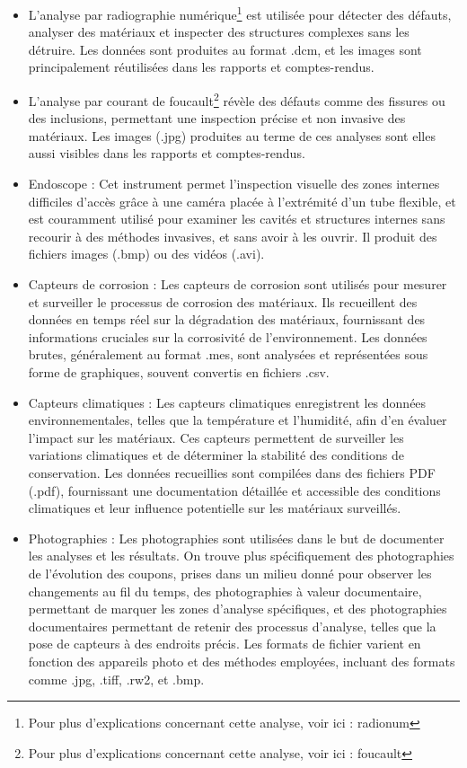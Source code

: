 \begin{itemize}
    \item L'analyse par radiographie numérique\footnote{Pour plus d'explications concernant cette analyse, voir ici : \gls{radionum}} est utilisée pour détecter des défauts, analyser des matériaux et inspecter des structures complexes sans les détruire. Les données sont produites au format .dcm, et les images sont principalement réutilisées dans les rapports et comptes-rendus.\\
    \item L'analyse par courant de foucault\footnote{Pour plus d'explications concernant cette analyse, voir ici : \gls{foucault}} révèle des défauts comme des fissures ou des inclusions, permettant une inspection précise et non invasive des matériaux. Les images (.jpg) produites au terme de ces analyses sont elles aussi visibles dans les rapports et comptes-rendus.\\
    \item Endoscope : Cet instrument permet l'inspection visuelle des zones internes difficiles d'accès grâce à une caméra placée à l'extrémité d'un tube flexible, et est couramment utilisé pour examiner les cavités et structures internes sans recourir à des méthodes invasives, et sans avoir à les ouvrir. Il produit des fichiers images (.bmp) ou des vidéos (.avi).\\
    \item Capteurs de corrosion : Les capteurs de corrosion sont utilisés pour mesurer et surveiller le processus de corrosion des matériaux. Ils recueillent des données en temps réel sur la dégradation des matériaux, fournissant des informations cruciales sur la corrosivité de l'environnement. Les données brutes, généralement au format .mes, sont analysées et représentées sous forme de graphiques, souvent convertis en fichiers .csv.\\
    \item Capteurs climatiques : Les capteurs climatiques enregistrent les données environnementales, telles que la température et l'humidité, afin d’en évaluer l’impact sur les matériaux. Ces capteurs permettent de surveiller les variations climatiques et de déterminer la stabilité des conditions de conservation. Les données recueillies sont compilées dans des fichiers PDF (.pdf), fournissant une documentation détaillée et accessible des conditions climatiques et leur influence potentielle sur les matériaux surveillés.\\
    \item Photographies : Les photographies sont utilisées dans le but de documenter les analyses et les résultats. On trouve plus spécifiquement des photographies de l’évolution des coupons, prises dans un milieu donné pour observer les changements au fil du temps, des photographies à valeur documentaire, permettant de marquer les zones d'analyse spécifiques, et des photographies documentaires permettant de retenir des processus d’analyse, telles que la pose de capteurs à des endroits précis. Les formats de fichier varient en fonction des appareils photo et des méthodes employées, incluant des formats comme .jpg, .tiff, .rw2, et .bmp.\\
\end{itemize}

